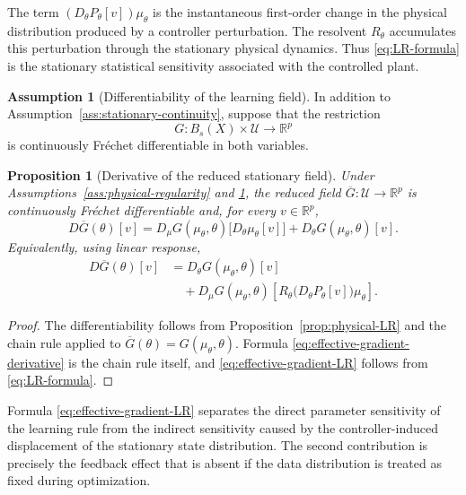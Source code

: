 \documentclass[11pt]{article}
\newtheorem{proposition}[theorem]{Proposition}
\theoremstyle{definition}
\newtheorem{assumption}[theorem]{Assumption}
\theoremstyle{remark}
\newcommand{\R}{\mathbb{R}}
\begin{document}
{The term
\(
  (D_\theta P_\theta[v])\mu_\theta
\)
is the instantaneous first-order change in the physical distribution produced
by a controller perturbation.  The resolvent \(R_\theta\) accumulates this
perturbation through the stationary physical dynamics.  Thus
\eqref{eq:LR-formula} is the stationary statistical sensitivity associated with
the controlled plant.

\begin{assumption}[Differentiability of the learning field]
\label{ass:learning-C1}
In addition to Assumption~\ref{ass:stationary-continuity}, suppose that the
restriction
\[
  G:B_s(X)\times\mathcal U\to\R^p
\]
is continuously Fr\'echet differentiable in both variables.
\end{assumption}

\begin{proposition}[Derivative of the reduced stationary field]
\label{prop:reduced-field-derivative}
Under Assumptions~\ref{ass:physical-regularity} and
\ref{ass:learning-C1}, the reduced field
\(\overline G:\mathcal U\to\R^p\) is continuously Fr\'echet differentiable
and, for every \(v\in\R^p\),
\begin{equation}
  D\overline G(\theta)[v]
  =D_\mu G(\mu_\theta,\theta)
     \bigl[D_\theta\mu_\theta[v]\bigr]
   +D_\theta G(\mu_\theta,\theta)[v].
  \label{eq:effective-gradient-derivative}
\end{equation}
Equivalently, using linear response,
\begin{equation}
\boxed{
\begin{aligned}
  D\overline G(\theta)[v]
  &=D_\theta G(\mu_\theta,\theta)[v]\\
  &\quad+
  D_\mu G(\mu_\theta,\theta)
  \left[
    R_\theta
    \bigl(D_\theta P_\theta[v]\bigr)\mu_\theta
  \right].
\end{aligned}}
  \label{eq:effective-gradient-LR}
\end{equation}
\end{proposition}

\begin{proof}
The differentiability follows from
Proposition~\ref{prop:physical-LR} and the chain rule applied to
\(\overline G(\theta)=G(\mu_\theta,\theta)\).  Formula
\eqref{eq:effective-gradient-derivative} is the chain rule itself, and
\eqref{eq:effective-gradient-LR} follows from \eqref{eq:LR-formula}.
\end{proof}

Formula \eqref{eq:effective-gradient-LR} separates the direct parameter
sensitivity of the learning rule from the indirect sensitivity caused by the
controller-induced displacement of the stationary state distribution.  The
second contribution is precisely the feedback effect that is absent if the
data distribution is treated as fixed during optimization.

}
\end{document}
